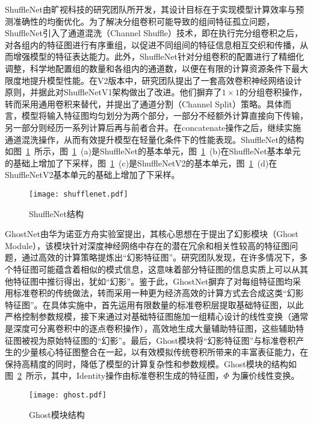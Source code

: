 ShuffleNet\cite{zhang2018shufflenet}由旷视科技的研究团队所开发，其设计目标在于实现模型计算效率与预测准确性的均衡优化。为了解决分组卷积可能导致的组间特征孤立问题，ShuffleNet引入了通道混洗（Channel Shuffle）技术，即在执行完分组卷积之后，对各组内的特征图进行有序重组，以促进不同组间的特征信息相互交织和传播，从而增强模型的特征表达能力。此外，ShuffleNet针对分组卷积的配置进行了精细化调整，科学地配置组的数量和各组内的通道数，以便在有限的计算资源条件下最大限度地提升模型性能。在V2\cite{ma2018shufflenet}版本中，研究团队提出了一套高效卷积神经网络设计原则，并据此对ShuffleNetV1架构做出了改进。他们摒弃了\(1 \times 1\)的分组卷积操作，转而采用通用卷积来替代，并提出了通道分割（Channel Split）策略。具体而言，模型将输入特征图均匀划分为两个部分，一部分不经额外计算直接向下传输，另一部分则经历一系列计算后再与前者合并。在concatenate操作之后，继续实施通道混洗操作，从而有效提升模型在轻量化条件下的性能表现。ShuffleNet的结构如图~\ref{fig:shufflenet}~所示，图~\ref{fig:shufflenet}~(a)是ShuffleNet的基本单元，图~\ref{fig:shufflenet}~(b)在ShuffleNet基本单元的基础上增加了下采样，图~\ref{fig:shufflenet}~(c)是ShuffleNetV2的基本单元，图~\ref{fig:shufflenet}~(d)在ShuffleNetV2基本单元的基础上增加了下采样。
\begin{figure}
    \centering
    \texttt{[image: shufflenet.pdf]}
    \caption{ShuffleNet结构\cite{ma2018shufflenet}}
    \label{fig:shufflenet}
\end{figure}

GhostNet\cite{han2020ghostnet}由华为诺亚方舟实验室提出，其核心思想在于提出了幻影模块（Ghost Module），该模块针对深度神经网络中存在的潜在冗余和相关性较高的特征图问题，通过高效的计算策略提炼出“幻影特征图”。研究团队发现，在许多情况下，多个特征图可能蕴含着相似的模式信息，这意味着部分特征图的信息实质上可以从其他特征图中推衍得出，犹如“幻影”。鉴于此，GhostNet摒弃了对每组特征图均采用标准卷积的传统做法，转而采用一种更为经济高效的计算方式去合成这类“幻影特征图”。在具体实施中，首先运用有限数量的标准卷积层提取基础特征图，以此严格控制参数规模，接下来通过对基础特征图施加一组精心设计的线性变换（通常是深度可分离卷积中的逐点卷积操作），高效地生成大量辅助特征图，这些辅助特征图被视为原始特征图的“幻影”。最后，Ghost模块将“幻影特征图”与标准卷积产生的少量核心特征图整合在一起，以有效模拟传统卷积所带来的丰富表征能力，在保持高精度的同时，降低了模型的计算复杂性和参数规模。Ghost模块的结构如图~\ref{fig:ghost}~所示，其中，Identity操作由标准卷积生成的特征图，\(\Phi\) 为廉价线性变换。
\begin{figure}
    \centering
    \texttt{[image: ghost.pdf]}
    \caption{Ghost模块结构\cite{han2020ghostnet}}
    \label{fig:ghost}
\end{figure}

